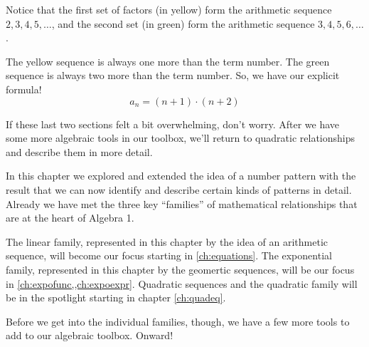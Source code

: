 \begin{boxex}
Notice that the first set of factors (in yellow) form the arithmetic sequence $2, 3, 4, 5, \dotsc$, and the second set (in green) form the arithmetic sequence $3, 4, 5, 6, \dotsc$.

The yellow sequence is always one more than the term number. The green sequence is always two more than the term number. So, we have our explicit formula! \[a_n = (n+1)\cdot(n+2)\]
\end{boxex}

If these last two sections felt a bit overwhelming, don't worry. After we have some more algebraic tools in our toolbox, we'll return to quadratic relationships and describe them in more detail.


\chaptersummary

In this chapter we explored and extended the idea of a number pattern with the result that we can now identify and describe certain kinds of patterns in detail. Already we have met the three key ``families'' of mathematical relationships that are at the heart of Algebra 1.

The linear family, represented in this chapter by the idea of an arithmetic sequence, will become our focus starting in \cref{ch:equations}. The exponential family, represented in this chapter by the geomertic sequences, will be our focus in \cref{ch:expofunc,,ch:expoexpr}. Quadratic sequences and the quadratic family will be in the spotlight starting in chapter \cref{ch:quadeq}.

Before we get into the individual families, though, we have a few more tools to add to our algebraic toolbox. Onward!

\chaptercopyright
